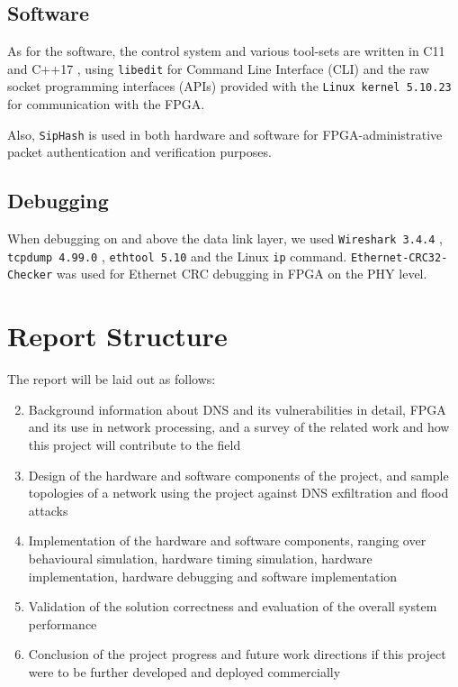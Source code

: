 \documentclass[a4paper]{report}
\newcommand{\proglang}{\textsf}
\newcommand{\code}{\texttt}
\begin{document}
\subsection{Software}
\label{section:introduction-tools-software}

As for the software, the control system and various tool-sets are written in \proglang{C11} \cite{iso-c} and \proglang{C++17} \cite{iso-cc}, using \code{libedit} \cite{thrysoee-2004} for Command Line Interface (CLI) and the raw socket programming interfaces (APIs) provided with the \code{Linux kernel 5.10.23} \cite{kroah-hartman-2021} for communication with the FPGA.

Also, \code{SipHash} \cite{aumasson-bernstein-2012} is used in both hardware and software for FPGA-administrative packet authentication and verification purposes.

\subsection{Debugging}
\label{section:introduction-tools-debugging}

When debugging on and above the data link layer, we used \code{Wireshark 3.4.4} \cite{wireshark-2021}, \code{tcpdump 4.99.0}
 \cite{tcpdump-2020}, \code{ethtool 5.10} \cite{kroah-hartman-2021} and the Linux \code{ip} command. \code{Ethernet-CRC32-Checker} \cite{jwbensley-2020} was used for Ethernet CRC debugging in FPGA on the PHY level.

\section{Report Structure}
The report will be laid out as follows:

\begin{enumerate}[leftmargin=*, label=Chapter \arabic* - ]
\setcounter{enumi}{1}
\item Background information about DNS and its vulnerabilities in detail, FPGA and its use in network processing, and a survey of the related work and how this project will contribute to the field
\item Design of the hardware and software components of the project, and sample topologies of a network using the project against DNS exfiltration and flood attacks
\item Implementation of the hardware and software components, ranging over behavioural simulation, hardware timing simulation, hardware implementation, hardware debugging and software implementation
\item Validation of the solution correctness and evaluation of the overall system performance
\item Conclusion of the project progress and future work directions if this project were to be further developed and deployed commercially
\end{enumerate}
\end{document}
